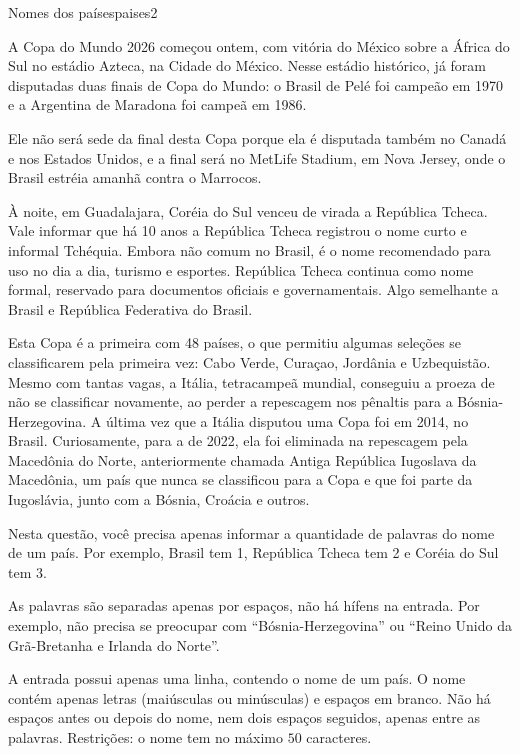 \documentclass[12pt,a4paper,oneside]{article}
\begin{document}
\begin{problem}{Nomes dos países}{paises}{2}

A Copa do Mundo 2026 começou ontem, com vitória do México sobre a África do Sul no estádio Azteca, na Cidade do México. Nesse estádio histórico, já foram disputadas duas finais de Copa do Mundo:
o Brasil de Pelé foi campeão em 1970 e a Argentina de Maradona foi campeã em 1986.

Ele não será sede da final desta Copa porque ela é disputada também no Canadá e nos Estados Unidos, e a final será no MetLife Stadium, em Nova Jersey, onde o Brasil estréia amanhã contra o Marrocos.

À noite, em Guadalajara, Coréia do Sul venceu de virada a República Tcheca. Vale informar que há 10 anos a República Tcheca registrou o nome curto e informal Tchéquia. Embora não comum no Brasil,
é o nome recomendado para uso no dia a dia, turismo e esportes. República Tcheca continua como nome formal, reservado para documentos oficiais e governamentais. Algo semelhante a Brasil e República Federativa do Brasil.

Esta Copa é a primeira com 48 países, o que permitiu algumas seleções se classificarem pela primeira vez: Cabo Verde, Curaçao, Jordânia e Uzbequistão.
Mesmo com tantas vagas, a Itália, tetracampeã mundial, conseguiu a proeza de não se classificar novamente, ao perder a repescagem nos pênaltis para a Bósnia-Herzegovina. A última vez que a Itália disputou uma Copa foi em 2014, no Brasil.
Curiosamente, para a de 2022, ela foi eliminada na repescagem pela Macedônia do Norte, anteriormente chamada Antiga República Iugoslava da Macedônia, um país que nunca se classificou para a Copa e que foi parte da Iugoslávia, junto com a Bósnia, Croácia e outros.

Nesta questão, você precisa apenas informar a quantidade de palavras do nome de um país. Por exemplo, Brasil tem 1, República Tcheca tem 2 e Coréia do Sul tem 3.

As palavras são separadas apenas por espaços, não há hífens na entrada. Por exemplo, não precisa se preocupar com ``Bósnia-Herzegovina'' ou ``Reino Unido da Grã-Bretanha e Irlanda do Norte''.

%

\InputFile

A entrada possui apenas uma linha, contendo o nome de um país.
O nome contém apenas letras (maiúsculas ou minúsculas) e espaços em branco.
Não há espaços antes ou depois do nome, nem dois espaços seguidos, apenas entre as palavras.
Restrições: o nome tem no máximo $50$ caracteres.


\end{problem}
\end{document}
